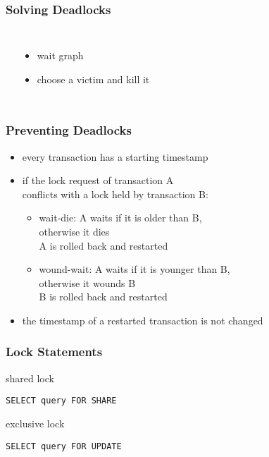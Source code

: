 \documentclass[dvipsnames]{beamer}
\theoremstyle{plain}
\begin{document}
\begin{frame}
  \frametitle{Solving Deadlocks}

  \begin{columns}[t]
    \begin{example}
      \begin{center}
      \end{center}
    \end{example}

    \begin{itemize}
      \item wait graph

      \pause
      \item choose a \alert{victim} and kill it
    \end{itemize}
  \end{columns}
\end{frame}

\begin{frame}
  \frametitle{Preventing Deadlocks}

  \begin{itemize}
    \item every transaction has a starting timestamp

    \pause
    \item if the lock request of transaction A\\
      conflicts with a lock held by transaction B:
    \begin{itemize}
      \item \alert{wait-die}: A waits if it is older than B,\\
        otherwise it dies\\
        A is rolled back and restarted

      \item \alert{wound-wait}: A waits if it is younger than B,\\
        otherwise it wounds B\\
        B is rolled back and restarted
    \end{itemize}

    \pause
    \item the timestamp of a restarted transaction is not changed
  \end{itemize}
\end{frame}

\begin{frame}[fragile]
  \frametitle{Lock Statements}

  \begin{block}{shared lock}
    \begin{lstlisting}
SELECT query FOR SHARE
    \end{lstlisting}
  \end{block}

  \pause
  \begin{block}{exclusive lock}
    \begin{lstlisting}
SELECT query FOR UPDATE
    \end{lstlisting}
  \end{block}
\end{frame}
\end{document}
